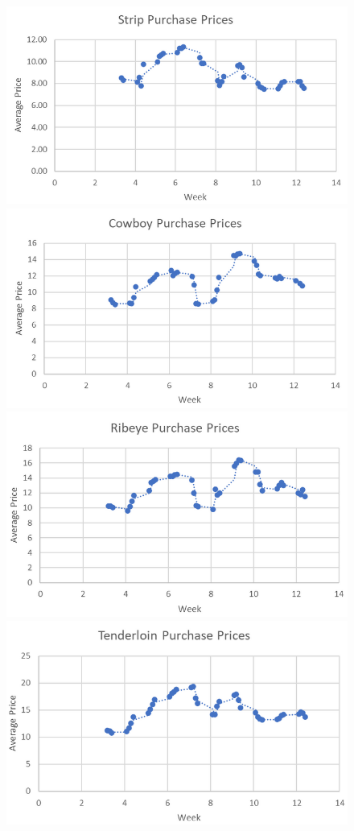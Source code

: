 \documentclass[12pt,a4paper]{article}
\begin{document}
\begin{figure}[H]
\centering
\includegraphics[scale=0.6]{./Figures/Figure1a.png}
\includegraphics[scale=0.6]{./Figures/Figure1b.png}
\includegraphics[scale=0.6]{./Figures/Figure1c.png}
\includegraphics[scale=0.6]{./Figures/Figure1d.png}

\end{figure}
\end{document}

